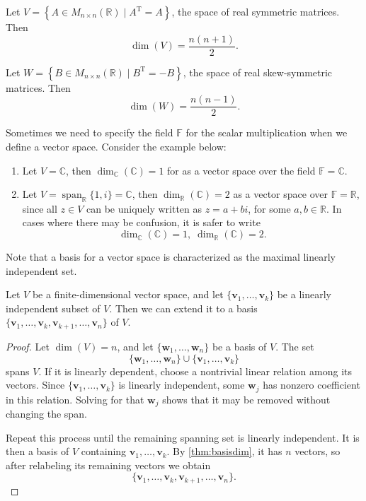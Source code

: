\begin{example}
Let \(V = \left\{ A \in M_{n \times n}(\mathbb{R}) \mid A^\mathrm{T} = A \right\}\), the space of real symmetric matrices. Then
\[
\dim(V) = \frac{n(n + 1)}{2}.
\]
\end{example}

\begin{example}
Let \(W = \left\{ B \in M_{n \times n}(\mathbb{R}) \mid B^\mathrm{T} = -B \right\}\), the space of real skew-symmetric matrices. Then
\[
\dim(W) = \frac{n(n - 1)}{2}.
\]
\end{example}

\begin{example}
Sometimes we need to specify the field \(\mathbb{F}\) for the scalar multiplication when we define a vector space. Consider the example below:
\begin{enumerate}
    \item Let \(V = \mathbb{C}\), then \(\dim _{\mathbb{C}}\left( \mathbb{C}\right)  = 1\) for as a vector space over the field \(\mathbb{F} = \mathbb{C}\).
    \item Let \(V = \operatorname{span}_{\mathbb{R}}\{ 1,i\}  = \mathbb{C}\), then \(\dim_{\mathbb{R}}\left( \mathbb{C}\right)  = 2\) as a vector space over \(\mathbb{F} = \mathbb{R}\), since all \(z \in  V\) can be uniquely written as \(z = a + {bi}\), for some \(a,b \in  \mathbb{R}\).
    In cases where there may be confusion, it is safer to write
    \[
    {\dim }_{\mathbb{C}}\left( \mathbb{C}\right)  = 1,\;{\dim }_{\mathbb{R}}\left( \mathbb{C}\right)  = 2.
    \]
\end{enumerate}    
\end{example}

Note that a basis for a vector space is characterized as the maximal linearly independent set.

\begin{theorem}\label{thm: basis-extension}
Let $V$ be a finite-dimensional vector space, and let $\{ \mathbf{v}_1, \ldots, \mathbf{v}_k \}$ be a linearly independent subset of $V$. Then we can extend it to a basis $\{ \mathbf{v}_1, \ldots, \mathbf{v}_k, \mathbf{v}_{k+1}, \ldots, \mathbf{v}_n \}$ of $V$.
\end{theorem}

\begin{proof}
Let $\dim(V)=n$, and let $\{ \mathbf{w}_1,\ldots,\mathbf{w}_n \}$ be a basis of $V$. The set
\[
\{ \mathbf{w}_1,\ldots,\mathbf{w}_n \}\cup\{ \mathbf{v}_1,\ldots,\mathbf{v}_k \}
\]
spans $V$. If it is linearly dependent, choose a nontrivial linear relation among its vectors. Since $\{ \mathbf{v}_1,\ldots,\mathbf{v}_k \}$ is linearly independent, some $\mathbf{w}_j$ has nonzero coefficient in this relation. Solving for that $\mathbf{w}_j$ shows that it may be removed without changing the span.

Repeat this process until the remaining spanning set is linearly independent. It is then a basis of $V$ containing $\mathbf{v}_1,\ldots,\mathbf{v}_k$. By \autoref{thm:basisdim}, it has $n$ vectors, so after relabeling its remaining vectors we obtain
\[
\{ \mathbf{v}_1,\ldots,\mathbf{v}_k,\mathbf{v}_{k+1},\ldots,\mathbf{v}_n \}.
\]
\end{proof}

